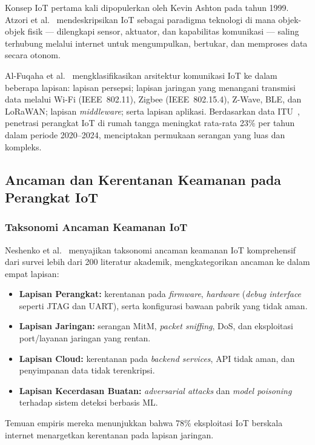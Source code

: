 \documentclass[conference]{IEEEtran}
\begin{document}
Konsep IoT pertama kali dipopulerkan oleh Kevin Ashton pada tahun 1999.
Atzori et al.\ \cite{atzori2010} mendeskripsikan IoT sebagai paradigma
teknologi di mana objek-objek fisik --- dilengkapi sensor, aktuator, dan
kapabilitas komunikasi --- saling terhubung melalui internet untuk
mengumpulkan, bertukar, dan memproses data secara otonom.

Al-Fuqaha et al.\ \cite{alfuqaha2015} mengklasifikasikan arsitektur
komunikasi IoT ke dalam beberapa lapisan: lapisan persepsi; lapisan
jaringan yang menangani transmisi data melalui Wi-Fi (IEEE~802.11),
Zigbee (IEEE~802.15.4), Z-Wave, BLE, dan LoRaWAN; lapisan
\textit{middleware}; serta lapisan aplikasi. Berdasarkan data
ITU~\cite{itu2024}, penetrasi perangkat IoT di rumah tangga meningkat
rata-rata 23\% per tahun dalam periode 2020--2024, menciptakan
permukaan serangan yang luas dan kompleks.

\subsection{Ancaman dan Kerentanan Keamanan pada Perangkat IoT}

\subsubsection{Taksonomi Ancaman Keamanan IoT}

Neshenko et al.\ \cite{neshenko2019} menyajikan taksonomi ancaman
keamanan IoT komprehensif dari survei lebih dari 200 literatur akademik,
mengkategorikan ancaman ke dalam empat lapisan:
\begin{itemize}
  \item \textbf{Lapisan Perangkat:} kerentanan pada \textit{firmware},
        \textit{hardware} (\textit{debug interface} seperti JTAG dan UART),
        serta konfigurasi bawaan pabrik yang tidak aman.
  \item \textbf{Lapisan Jaringan:} serangan MitM, \textit{packet sniffing},
        DoS, dan eksploitasi port/layanan jaringan yang rentan.
  \item \textbf{Lapisan Cloud:} kerentanan pada \textit{backend services},
        API tidak aman, dan penyimpanan data tidak terenkripsi.
  \item \textbf{Lapisan Kecerdasan Buatan:} \textit{adversarial attacks}
        dan \textit{model poisoning} terhadap sistem deteksi berbasis ML.
\end{itemize}

Temuan empiris mereka menunjukkan bahwa 78\% eksploitasi IoT berskala
internet menargetkan kerentanan pada lapisan jaringan.
\end{document}
